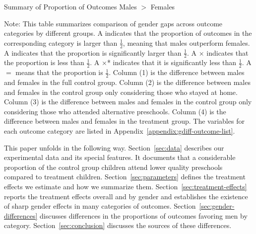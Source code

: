 \begin{table}[H]
\centering
\caption{Summary of Proportion of Outcomes Males $>$ Females}
\label{tab:proportion-table}
\begin{threeparttable}

\begin{tablenotes}
\footnotesize
\item Note: This table summarizes comparison of gender gaps across outcome categories by different groups. A \checkmark indicates that the proportion of outcomes in the corresponding category is larger than $\frac{1}{2}$, meaning that males outperform females. A \checkmark* indicates that the proportion is significantly larger than $\frac{1}{2}$. A $\times$ indicates that the proportion is less than $\frac{1}{2}$. A $\times$* indicates that it is significantly less than $\frac{1}{2}$. A $=$ means that the proportion is $\frac{1}{2}$. Column (1) is the difference between males and females in the full control group.  Column (2) is the difference between males and females in the control group only considering those who stayed at home. Column (3) is the difference between males and females in the control group only considering those who attended alternative preschools. Column (4) is the difference between males and females in the treatment group. The variables for each outcome category are listed in Appendix~\ref{appendix:gdiff-outcome-list}.
\end{tablenotes}
\end{threeparttable}
\end{table}

This paper unfolds in the following way. Section~\ref{sec:data} describes our experimental data and its special features. It documents that a considerable proportion of the control group children attend lower quality preschools compared to treatment children. Section~\ref{sec:parameters} defines the treatment effects we estimate and how we summarize them. Section~\ref{sec:treatment-effects} reports the treatment effects overall and by gender and establishes the existence of sharp gender effects in many categories of outcomes. Section~\ref{sec:gender-differences} discusses differences in the proportions of outcomes favoring men by category. Section~\ref{sec:conclusion} discusses the sources of these differences.


